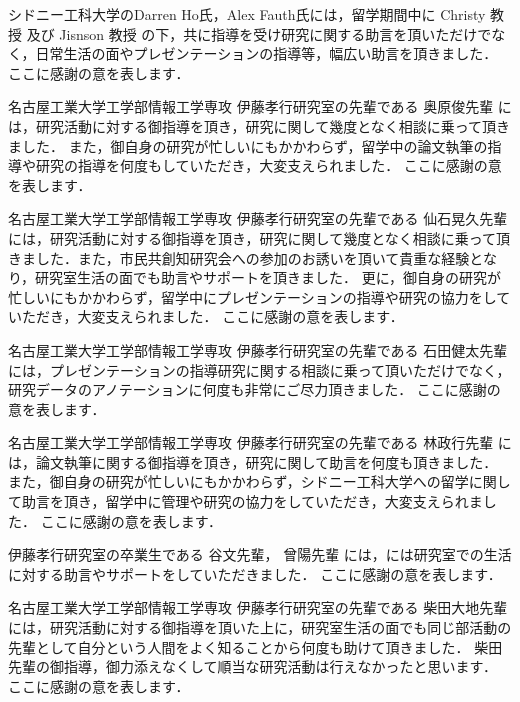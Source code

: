 シドニー工科大学のDarren Ho氏，Alex Fauth氏には，留学期間中に Christy 教授 及び Jisnson 教授 の下，共に指導を受け研究に関する助言を頂いただけでなく，日常生活の面やプレゼンテーションの指導等，幅広い助言を頂きました．
ここに感謝の意を表します． \par
\vspace{0.5cm}

名古屋工業大学工学部情報工学専攻 伊藤孝行研究室の先輩である 奥原俊先輩 には，研究活動に対する御指導を頂き，研究に関して幾度となく相談に乗って頂きました．
また，御自身の研究が忙しいにもかかわらず，留学中の論文執筆の指導や研究の指導を何度もしていただき，大変支えられました．
ここに感謝の意を表します． \par
\vspace{0.5cm}

名古屋工業大学工学部情報工学専攻 伊藤孝行研究室の先輩である 仙石晃久先輩 には，研究活動に対する御指導を頂き，研究に関して幾度となく相談に乗って頂きました．また，市民共創知研究会への参加のお誘いを頂いて貴重な経験となり，研究室生活の面でも助言やサポートを頂きました．
更に，御自身の研究が忙しいにもかかわらず，留学中にプレゼンテーションの指導や研究の協力をしていただき，大変支えられました．
ここに感謝の意を表します． \par
\vspace{0.5cm}

名古屋工業大学工学部情報工学専攻 伊藤孝行研究室の先輩である 石田健太先輩 には，プレゼンテーションの指導研究に関する相談に乗って頂いただけでなく，研究データのアノテーションに何度も非常にご尽力頂きました．
ここに感謝の意を表します． \par
\vspace{0.5cm}

名古屋工業大学工学部情報工学専攻 伊藤孝行研究室の先輩である 林政行先輩 には，論文執筆に関する御指導を頂き，研究に関して助言を何度も頂きました．
また，御自身の研究が忙しいにもかかわらず，シドニー工科大学への留学に関して助言を頂き，留学中に管理や研究の協力をしていただき，大変支えられました．
ここに感謝の意を表します． \par
\vspace{0.5cm}

伊藤孝行研究室の卒業生である 谷文先輩， 曾陽先輩 には，には研究室での生活に対する助言やサポートをしていただきました．
ここに感謝の意を表します． \par
\vspace{0.5cm}

名古屋工業大学工学部情報工学専攻 伊藤孝行研究室の先輩である 柴田大地先輩 には，研究活動に対する御指導を頂いた上に，研究室生活の面でも同じ部活動の先輩として自分という人間をよく知ることから何度も助けて頂きました．
柴田先輩の御指導，御力添えなくして順当な研究活動は行えなかったと思います．
ここに感謝の意を表します． \par
\vspace{0.5cm}


